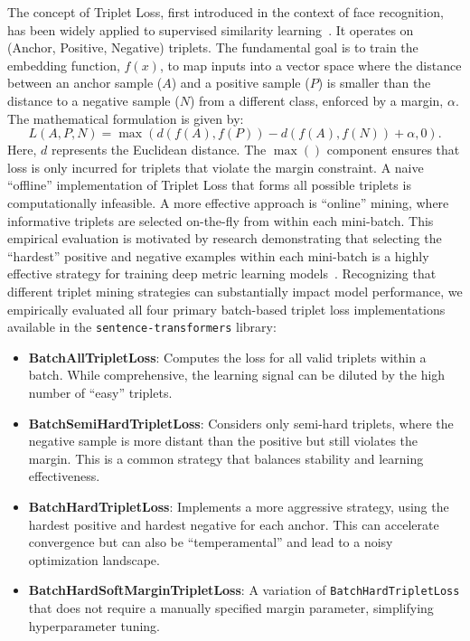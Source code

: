 The concept of Triplet Loss, first introduced in the context of face recognition, has been widely applied to supervised similarity learning~\cite{Yu2020}. It operates on (Anchor, Positive, Negative) triplets. The fundamental goal is to train the embedding function, \(f(x)\), to map inputs into a vector space where the distance between an anchor sample (\(A\)) and a positive sample (\(P\)) is smaller than the distance to a negative sample (\(N\)) from a different class, enforced by a margin, \(\alpha\). The mathematical formulation is given by:
\[ L(A,P,N)=\max(d(f(A),f(P))-d(f(A),f(N))+\alpha,0). \]
Here, \(d\) represents the Euclidean distance. The \(\max()\) component ensures that loss is only incurred for triplets that violate the margin constraint. A naive ``offline'' implementation of Triplet Loss that forms all possible triplets is computationally infeasible. A more effective approach is ``online'' mining, where informative triplets are selected on-the-fly from within each mini-batch. This empirical evaluation is motivated by research demonstrating that selecting the ``hardest'' positive and negative examples within each mini-batch is a highly effective strategy for training deep metric learning models~\cite{hermans2017defensetripletlossperson}.  Recognizing that different triplet mining strategies can substantially impact model performance, we empirically evaluated all four primary batch-based triplet loss implementations available in the \verb|sentence-transformers| library:
\begin{itemize}
    \item \textbf{BatchAllTripletLoss}: Computes the loss for all valid triplets within a batch. While comprehensive, the learning signal can be diluted by the high number of ``easy'' triplets.
    \item \textbf{BatchSemiHardTripletLoss}: Considers only semi-hard triplets, where the negative sample is more distant than the positive but still violates the margin. This is a common strategy that balances stability and learning effectiveness.
    \item \textbf{BatchHardTripletLoss}: Implements a more aggressive strategy, using the hardest positive and hardest negative for each anchor. This can accelerate convergence but can also be ``temperamental'' and lead to a noisy optimization landscape.
    \item \textbf{BatchHardSoftMarginTripletLoss}: A variation of \verb|BatchHardTripletLoss| that does not require a manually specified margin parameter, simplifying hyperparameter tuning.
\end{itemize}

